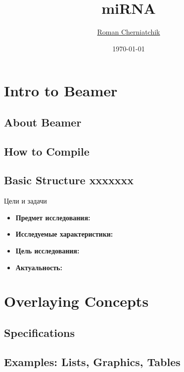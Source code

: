 \documentclass[14pt,pdf]{beamer}
\title{miRNA}
\author{\href{mailto:roman.cherniatchik@jetbrains.com}{Roman Cherniatchik}}
\institute{JetBrains Biolabs}
\date{\today}
\begin{document}
	\maketitle
	
	\tableofcontents[]
	

  	\section{Intro to Beamer}
	\subsection{About Beamer}
	\subsection{How to Compile}
	\subsection[Basic Structure ttt]{Basic Structure xxxxxxx} 
	
	\begin{frame}{Цели и задачи}
		\begin{itemize}
			\item \textbf{Предмет исследования:} 
			\item \textbf{Исследуемые характеристики:} 
			\item \textbf{Цель исследования:} 
			\item \textbf{Актуальность:} 
		\end{itemize}
	\end{frame}


	\section{Overlaying Concepts} \subsection{Specifications} \subsection[Examples]{Examples: Lists, Graphics, Tables}
\end{document}
